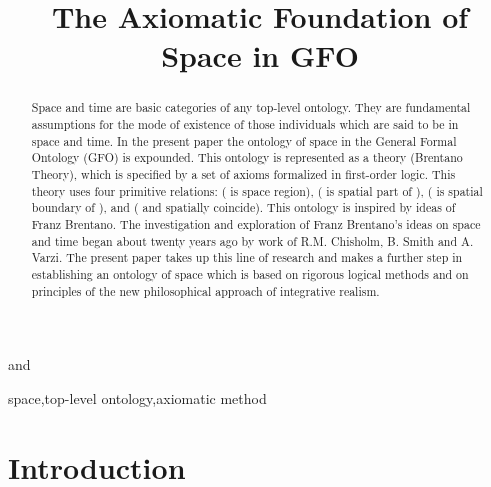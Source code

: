 \documentclass{ao2e}
\begin{document}
\begin{frontmatter}                           \title{The Axiomatic Foundation of Space in GFO}


\author[A]{ } and
\author[B]{ }
\address[A]{Department of Intelligent Systems, University of Leipzig\\
E-mail: baumann@informatik.uni-leipzig.de}
\address[B]{Institute for Medical Informatics, Statistics and Epidemiology,
University of Leipzig\\
E-mail: heinrich.herre@imise.uni-leipzig.de}

\begin{abstract}
Space and time are basic categories of any top-level ontology. They are fundamental assumptions for
the mode of existence of those individuals which are said to be in space and time. 
In the present paper the ontology of space in the General Formal Ontology (GFO) is expounded.
This ontology  is represented as a theory  (Brentano Theory), which is specified by a set of axioms formalized in first-order logic.
This theory uses four primitive relations:  ( is space region),
 ( is spatial part of ),  ( is spatial boundary of ), and  ( and 
spatially coincide). This ontology is inspired by ideas of Franz Brentano.
The investigation and exploration of Franz Brentano's ideas on space and time
began about twenty years ago by work of R.M. Chisholm, B. Smith and A. Varzi. 
The present paper takes up this line of research and makes a further step in establishing an ontology of space
which is based on rigorous logical methods and on principles of the new philosophical approach of
integrative realism.


\end{abstract}

\begin{keyword}
space\sep top-level ontology\sep axiomatic method
\end{keyword}

\end{frontmatter}





\section{Introduction}
\end{document}
